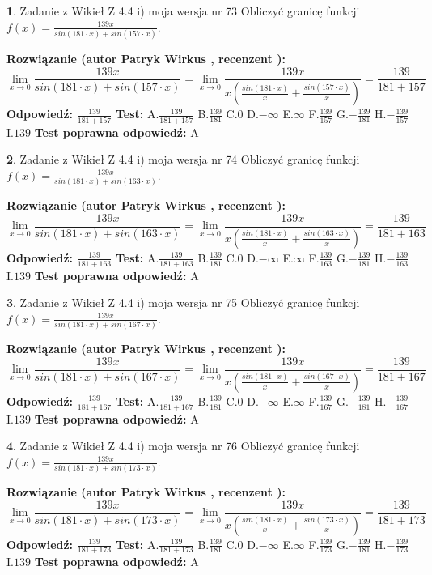 \documentclass[12pt, a4paper]{article}
\theoremstyle{definition} %
\newtheorem{zad}{}
\newcommand{\zadStart}[1]{\begin{zad}#1\newline}
\newcommand{\zadStop}{\end{zad}}
\newcommand{\rozwStart}[2]{\noindent \textbf{Rozwiązanie (autor #1 , recenzent #2): }\newline}
\newcommand{\rozwStop}{\newline}
\newcommand{\odpStart}{\noindent \textbf{Odpowiedź:}\newline}
\newcommand{\odpStop}{\newline}
\newcommand{\testStart}{\noindent \textbf{Test:}\newline}
\newcommand{\testStop}{\newline}
\newcommand{\kluczStart}{\noindent \textbf{Test poprawna odpowiedź:}\newline}
\newcommand{\kluczStop}{\newline}
\begin{document}
\zadStart{Zadanie z Wikieł Z 4.4 i) moja wersja nr 73}
Obliczyć granicę funkcji $f(x)=\frac{139x}{sin(181\cdot x) +sin(157\cdot x)}$.
\zadStop
\rozwStart{Patryk Wirkus}{}
$$\lim\limits_{x\to 0}\frac{139x}{sin(181\cdot x) +sin(157\cdot x)}=\lim\limits_{x\to 0}\frac{139x}{x(\frac{sin(181\cdot x)}{x}+\frac{sin(157\cdot x)}{x})}=\frac{139}{181+157}$$
\rozwStop
\odpStart
$\frac{139}{181+157}$
\odpStop
\testStart
A.$\frac{139}{181+157}$
B.$\frac{139}{181}$
C.$0$
D.$-\infty$
E.$\infty$
F.$\frac{139}{157}$
G.$-\frac{139}{181}$
H.$-\frac{139}{157}$
I.$139$
\testStop
\kluczStart
A
\kluczStop



\zadStart{Zadanie z Wikieł Z 4.4 i) moja wersja nr 74}
Obliczyć granicę funkcji $f(x)=\frac{139x}{sin(181\cdot x) +sin(163\cdot x)}$.
\zadStop
\rozwStart{Patryk Wirkus}{}
$$\lim\limits_{x\to 0}\frac{139x}{sin(181\cdot x) +sin(163\cdot x)}=\lim\limits_{x\to 0}\frac{139x}{x(\frac{sin(181\cdot x)}{x}+\frac{sin(163\cdot x)}{x})}=\frac{139}{181+163}$$
\rozwStop
\odpStart
$\frac{139}{181+163}$
\odpStop
\testStart
A.$\frac{139}{181+163}$
B.$\frac{139}{181}$
C.$0$
D.$-\infty$
E.$\infty$
F.$\frac{139}{163}$
G.$-\frac{139}{181}$
H.$-\frac{139}{163}$
I.$139$
\testStop
\kluczStart
A
\kluczStop



\zadStart{Zadanie z Wikieł Z 4.4 i) moja wersja nr 75}
Obliczyć granicę funkcji $f(x)=\frac{139x}{sin(181\cdot x) +sin(167\cdot x)}$.
\zadStop
\rozwStart{Patryk Wirkus}{}
$$\lim\limits_{x\to 0}\frac{139x}{sin(181\cdot x) +sin(167\cdot x)}=\lim\limits_{x\to 0}\frac{139x}{x(\frac{sin(181\cdot x)}{x}+\frac{sin(167\cdot x)}{x})}=\frac{139}{181+167}$$
\rozwStop
\odpStart
$\frac{139}{181+167}$
\odpStop
\testStart
A.$\frac{139}{181+167}$
B.$\frac{139}{181}$
C.$0$
D.$-\infty$
E.$\infty$
F.$\frac{139}{167}$
G.$-\frac{139}{181}$
H.$-\frac{139}{167}$
I.$139$
\testStop
\kluczStart
A
\kluczStop



\zadStart{Zadanie z Wikieł Z 4.4 i) moja wersja nr 76}
Obliczyć granicę funkcji $f(x)=\frac{139x}{sin(181\cdot x) +sin(173\cdot x)}$.
\zadStop
\rozwStart{Patryk Wirkus}{}
$$\lim\limits_{x\to 0}\frac{139x}{sin(181\cdot x) +sin(173\cdot x)}=\lim\limits_{x\to 0}\frac{139x}{x(\frac{sin(181\cdot x)}{x}+\frac{sin(173\cdot x)}{x})}=\frac{139}{181+173}$$
\rozwStop
\odpStart
$\frac{139}{181+173}$
\odpStop
\testStart
A.$\frac{139}{181+173}$
B.$\frac{139}{181}$
C.$0$
D.$-\infty$
E.$\infty$
F.$\frac{139}{173}$
G.$-\frac{139}{181}$
H.$-\frac{139}{173}$
I.$139$
\testStop
\kluczStart
A
\kluczStop
\end{document}
